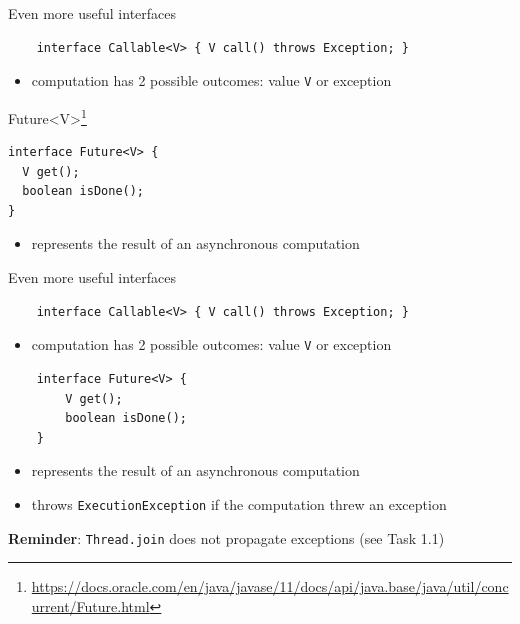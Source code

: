 \begin{frame}[t,fragile]{Even more useful interfaces}

\begin{verbatim}
    interface Callable<V> { V call() throws Exception; }
\end{verbatim}

\begin{itemize}
    \item computation has 2 possible outcomes: value \texttt{V} or exception
\end{itemize}

\pause

Future<V>\footnote<2->{\tiny\url{https://docs.oracle.com/en/java/javase/11/docs/api/java.base/java/util/concurrent/Future.html}}
\begin{verbatim}
interface Future<V> {
  V get();
  boolean isDone();
}
\end{verbatim}

\begin{itemize}
    \item represents the result of an asynchronous computation
\end{itemize}
\end{frame}


\begin{frame}{Even more useful interfaces}

\begin{verbatim}
    interface Callable<V> { V call() throws Exception; }
\end{verbatim}

\begin{itemize}
    \item computation has 2 possible outcomes: value \texttt{V} or exception
\end{itemize}

\begin{verbatim}
    interface Future<V> { 
        V get();
        boolean isDone(); 
    }
\end{verbatim}

\begin{itemize}
    \item represents the result of an asynchronous computation
    \item throws \texttt{ExecutionException} if the computation threw an exception
\end{itemize}

\pause

\textbf{Reminder}: \texttt{Thread.join} does not propagate exceptions (see Task 1.1)

\end{frame}


